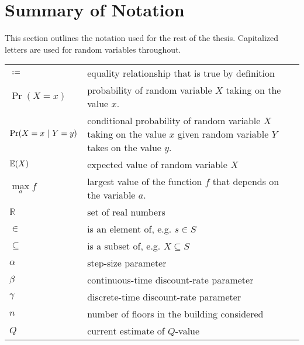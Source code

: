 \section*{Summary of Notation}

This section outlines the notation used for the rest of the thesis. Capitalized letters are used for random variables throughout.

\begin{table}[H]
    \begin{tabular}{l l}
        $\coloneqq$ & equality relationship that is true by definition\\
        $\Pr(X = x)$ & probability of random variable $X$ taking on the value $x$.\\
        $\Pr(X = x \ |\  Y = y)$ & conditional probability of random variable $X$ taking on the value $x$ given random variable $Y$ takes on the value $y$.\\
        $\mathbb{E}(X)$ & expected value of random variable $X$\\
        $\max\limits_a f$ & largest value of the function $f$ that depends on the variable $a$.\\
        $\mathbb{R}$ & set of real numbers\\
        $\in$ & is an element of, e.g. $s \in S$\\
        $\subseteq$ & is a subset of, e.g. $X\subseteq S$\\
        $\alpha$ & step-size parameter\\
        $\beta$ & continuous-time discount-rate parameter\\
        $\gamma$ & discrete-time discount-rate parameter\\
        $n$ & number of floors in the building considered\\
        $Q$ & current estimate of $Q$-value\\
    \end{tabular}
\end{table}